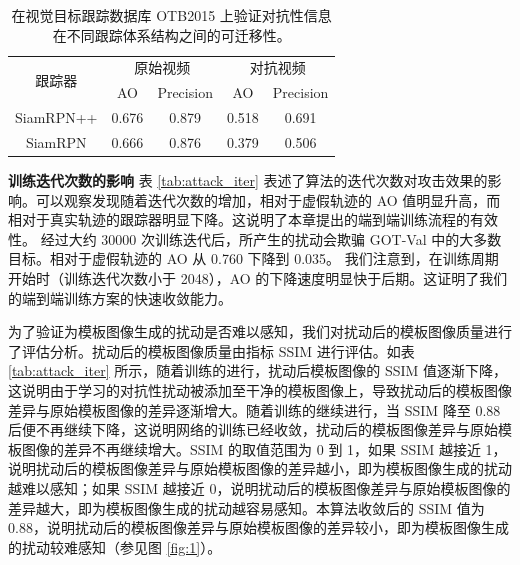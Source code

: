 \begin{table}[t]
\caption{在视觉目标跟踪数据库 OTB2015 上验证对抗性信息在不同跟踪体系结构之间的可迁移性。}
\centering
\begin{tabular}{ccccc} 
\toprule
\multirow{2}{*}[-2pt]{跟踪器} & \multicolumn{2}{c}{原始视频} & \multicolumn{2}{c}{对抗视频}  \\
\cmidrule(lr){2-3} \cmidrule(lr){4-5}
                          & AO & Precision              & AO & Precision                   \\
\midrule
SiamRPN++                 & 0.676   & 0.879                  & 0.518   & 0.691                       \\
SiamRPN                   & 0.666   & 0.876                  & 0.379   & 0.506                       \\
\bottomrule
\end{tabular}
\label{tab:arch}
\end{table}

\textbf{训练迭代次数的影响} 表 \ref{tab:attack_iter} 表述了算法的迭代次数对攻击效果的影响。可以观察发现随着迭代次数的增加，相对于虚假轨迹的 AO 值明显升高，而相对于真实轨迹的跟踪器明显下降。这说明了本章提出的端到端训练流程的有效性。
经过大约 30000 次训练迭代后，所产生的扰动会欺骗 GOT-Val 中的大多数目标。相对于虚假轨迹的 AO 从 0.760 下降到 0.035。
我们注意到，在训练周期开始时（训练迭代次数小于 2048），AO 的下降速度明显快于后期。这证明了我们的端到端训练方案的快速收敛能力。

为了验证为模板图像生成的扰动是否难以感知，我们对扰动后的模板图像质量进行了评估分析。扰动后的模板图像质量由指标 SSIM 进行评估。如表 \ref{tab:attack_iter} 所示，随着训练的进行，扰动后模板图像的 SSIM 值逐渐下降，这说明由于学习的对抗性扰动被添加至干净的模板图像上，导致扰动后的模板图像差异与原始模板图像的差异逐渐增大。随着训练的继续进行，当 SSIM 降至 0.88 后便不再继续下降，这说明网络的训练已经收敛，扰动后的模板图像差异与原始模板图像的差异不再继续增大。SSIM 的取值范围为 0 到 1，如果 SSIM 越接近 1，说明扰动后的模板图像差异与原始模板图像的差异越小，即为模板图像生成的扰动越难以感知；如果 SSIM 越接近 0，说明扰动后的模板图像差异与原始模板图像的差异越大，即为模板图像生成的扰动越容易感知。本算法收敛后的 SSIM 值为 0.88，说明扰动后的模板图像差异与原始模板图像的差异较小，即为模板图像生成的扰动较难感知（参见图 \ref{fig:1}）。

